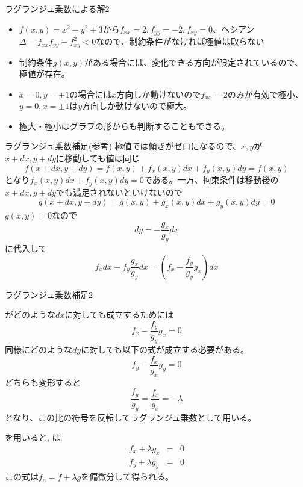 \begin{slide}{ラグランジュ乗数による解2}
\begin{itemize}
\item $f(x,y) = x^2 - y^2 + 3$から$f_{xx} = 2, f_{yy} = -2, f_{xy} =0$、ヘシアン$\Delta = f_{xx}f_{yy} - f_{xy}^2<0$なので、制約条件がなければ極値は取らない
\item 制約条件$g(x,y)$がある場合には、変化できる方向が限定されているので、極値が存在。
\item $x=0, y=\pm 1$の場合には$x$方向しか動けないので$f_{xx}=2$のみが有効で極小、 $y=0, x=\pm 1$は$y$方向しか動けないので極大。
\item 極大・極小はグラフの形からも判断することもできる。
\end{itemize}
\end{slide}
\begin{slide}{ラグランジュ乗数補足(参考)}
極値では傾きがゼロになるので、$x,y$が$x+dx, y+dy$に移動しても値は同じ
\begin{equation}
f(x+dx, y+dy) = f(x, y) + f_x(x,y) dx + f_y(x,y) dy  =f(x,y) \label{eq:lagd}
\end{equation}
となり$f_x(x,y) dx + f_y(x,y) dy = 0$である。一方、拘束条件は移動後の$x+dx, y+dy$でも満足されないといけないので
\begin{equation}
g(x+dx, y+dy) = g(x,y) + g_x(x,y)dx + g_y(x,y) dy = 0 \nonumber
\end{equation}
$g(x,y)=0$なので
\begin{equation}
dy = -\frac{g_x}{g_y} dx \nonumber 
\end{equation}
に代入して
\begin{equation}
f_x dx -f_y \frac{g_x}{g_y} dx= (f_x - \frac{f_y}{g_y} g_x)dx \label{eq:lagd2}
\end{equation}
\end{slide}
\begin{slide}{ラグランジュ乗数補足2}

がどのような$dx$に対しても成立するためには
\begin{equation}
f_x - \frac{f_y}{g_y} g_x = 0 \label{eq:lagf1}
\end{equation}
同様にどのような$dy$に対しても以下の式が成立する必要がある。
\begin{equation}
f_y - \frac{f_x}{g_x}g_y = 0 \label{eq:lagf2}
\end{equation}
どちらも変形すると
\begin{equation}
\frac{f_y}{g_y} = \frac{f_x}{g_x} = -\lambda \label{eq:lm}
\end{equation}
となり、この比の符号を反転してラグランジュ乗数として用いる。

を用いると, は
\begin{eqnarray}
f_x +\lambda g_x &=& 0 \nonumber \\
f_y +\lambda g_y &=& 0 \nonumber 
\end{eqnarray}
この式は$f_a = f + \lambda g$を偏微分して得られる。
\end{slide}
